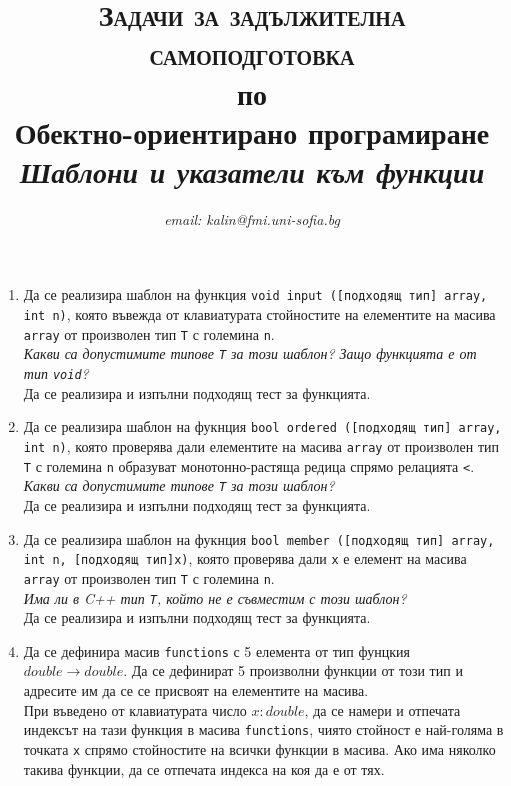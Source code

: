 \documentclass[12pt,a4paper]{article}
\author{\textit{email: kalin@fmi.uni-sofia.bg}}
\title{\textsc{Задачи за задължителна самоподготовка} \\
по \\
Обектно-ориентирано програмиране\\
\textit{Шаблони и указатели към функции}}
\begin{document}
\maketitle


\begin{enumerate}
	\item Да се реализира шаблон на функция \texttt{void input ([подходящ тип] array, int n)}, която въвежда от клавиатурата стойностите на елементите на масива \texttt{array} от произволен тип \texttt{T} с големина \texttt{n}. \\

	\textit{Какви са допустимите типове \texttt{T} за този шаблон? Защо функцията е от тип \texttt{void}?}\\

	Да се реализира и изпълни подходящ тест за функцията.

	\item Да се реализира шаблон на фукнция \texttt{bool ordered ([подходящ тип] array, int n)}, която проверява дали елементите на масива \texttt{array} от произволен тип \texttt{T} с големина \texttt{n} образуват монотонно-растяща редица спрямо релацията \texttt{<}.\\

	\textit{Какви са допустимите типове \texttt{T} за този шаблон?}\\

	Да се реализира и изпълни подходящ тест за функцията.

	\item Да се реализира шаблон на фукнция \texttt{bool member ([подходящ тип] array, int n, [подходящ тип]x)}, която проверява дали \texttt{x} е елемент на масива \texttt{array} от произволен тип \texttt{T} с големина \texttt{n}.\\

	\textit{Има ли в C++ тип \texttt{T}, който не е съвместим с този шаблон?}\\

	Да се реализира и изпълни подходящ тест за функцията.

	\item Да се дефинира масив \texttt{functions} с 5 елемента от тип фунцкия $double \rightarrow double$. Да се дефинират 5 произволни функции от този тип и адресите им да се се присвоят на елементите на масива.\\

	При въведено от клавиатурата число $x:double$, да се намери и отпечата индексът на тази функция в масива \texttt{functions}, чиято стойност е най-голяма в точката \texttt{x} спрямо стойностите на всички функции в масива. Ако има няколко такива функции, да се отпечата индекса на коя да е от тях. 


\end{enumerate}
\end{document}
